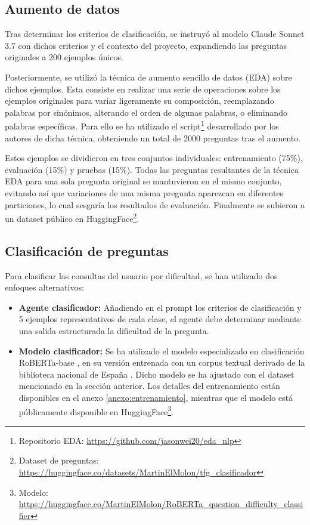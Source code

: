 \subsection{Aumento de datos}
Tras determinar los criterios de clasificación, se instruyó al modelo Claude Sonnet 3.7 con dichos criterios y el contexto del proyecto, expandiendo las preguntas originales a 200 ejemplos únicos.

Posteriormente, se utilizó la técnica de aumento sencillo de datos (EDA) \cite{wei_eda_2019} sobre dichos ejemplos. Esta consiste en realizar una serie de operaciones sobre los ejemplos originales para variar ligeramente su composición, reemplazando palabras por sinónimos, alterando el orden de algunas palabras, o eliminando palabras específicas. Para ello se ha utilizado el script\footnote{Repositorio EDA: \url{https://github.com/jasonwei20/eda_nlp}} desarrollado por los autores de dicha técnica, obteniendo un total de 2000 preguntas tras el aumento.

Estos ejemplos se dividieron en tres conjuntos individuales: entrenamiento (75\%), evaluación (15\%) y pruebas (15\%). Todas las preguntas resultantes de la técnica EDA para una sola pregunta original se mantuvieron en el mismo conjunto, evitando así que variaciones de una misma pregunta aparezcan en diferentes particiones, lo cual sesgaría los resultados de evaluación. Finalmente se subieron a un dataset público en HuggingFace\footnote{Dataset de preguntas: \url{https://huggingface.co/datasets/MartinElMolon/tfg_clasificador}}.

\subsection{Clasificación de preguntas}
Para clasificar las consultas del usuario por dificultad, se han utilizado dos enfoques alternativos:

\begin{itemize}
\item\textbf{Agente clasificador: }Añadiendo en el prompt los criterios de clasificación y 5 ejemplos representativos de cada clase, el agente debe determinar mediante una salida estructurada la dificultad de la pregunta.
\item\textbf{Modelo clasificador: }Se ha utilizado el modelo especializado en clasificación RoBERTa-base \cite{liu_roberta_2019}, en su versión entrenada con un corpus textual derivado de la biblioteca nacional de España \cite{gutierrez-fandino_maria_2021}. Dicho modelo se ha ajustado con el dataset mencionado en la sección anterior. Los detalles del entrenamiento están disponibles en el anexo \ref{anexo:entrenamiento}, mientras que el modelo está públicamente disponible en HuggingFace\footnote{Modelo: \url{https://huggingface.co/MartinElMolon/RoBERTa_question_difficulty_classifier}}.

\end{itemize}
